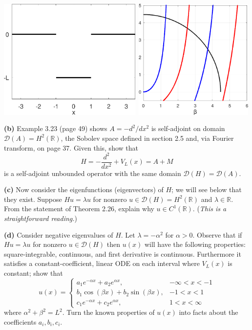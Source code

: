 \documentclass[12pt]{amsart}
\newcommand{\cD}{\mathcal{D}}
\newcommand{\RR}{\mathbb{R}}
\newcommand{\epart}[1]{\medskip\noindent\textbf{(#1)}\quad }
\begin{document}
\bigskip
\begin{center}
\mbox{\includegraphics[height=60mm]{figs/squarepot.pdf} \hspace{10mm} \includegraphics[height=60mm]{figs/squareeigs.png}}
\end{center}

\medskip
\epart{b}  Example 3.23 (page 49) shows $A = -d^2/dx^2$ is self-adjoint on domain $\cD(A)=H^2(\RR)$, the Sobolev space defined in section 2.5 and, via Fourier transform, on page 37.  Given this, show that
	$$H=-\frac{d^2}{dx^2} + V_L(x) = A + M$$
is a self-adjoint unbounded operator with the same domain $\cD(H)=\cD(A)$.

\epart{c}  Now consider the eigenfunctions (eigenvectors) of $H$; we will see below that they exist.  Suppose $Hu=\lambda u$ for nonzero $u\in\cD(H)=H^2(\RR)$ and $\lambda\in\RR$.  From the statement of Theorem 2.26, explain why $u\in C^1(\RR)$.  (\emph{This is a straightforward reading.})

\epart{d}  Consider negative eigenvalues of $H$.  Let $\lambda=-\alpha^2$ for $\alpha > 0$.  Observe that if $Hu=\lambda u$ for nonzero $u\in\cD(H)$ then $u(x)$ will have the following properties: square-integrable, continuous, and first derivative is continuous.  Furthermore it satisfies a constant-coefficient, linear ODE on each interval where $V_L(x)$ is constant; show that
    $$u(x) = \begin{cases}
                a_1 e^{-\alpha x} + a_2 e^{\alpha x}, & -\infty < x < -1 \\
                b_1 \cos(\beta x) + b_2 \sin(\beta x), & -1 < x < 1 \\
                c_1 e^{-\alpha x} + c_2 e^{\alpha x}, & 1 < x < \infty
             \end{cases}$$
where $\alpha^2+\beta^2=L^2$.  Turn the known properties of $u(x)$ into facts about the coefficients $a_i,b_i,c_i$.
\end{document}
